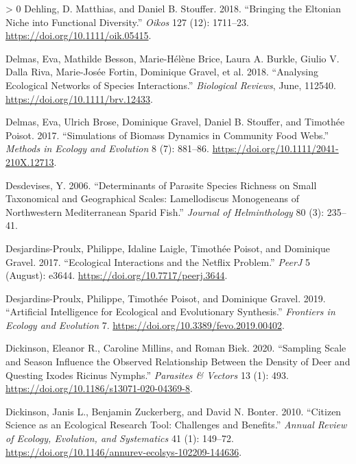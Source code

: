 \documentclass[11pt]{article}
\newlength{\cslhangindent}
\newenvironment{CSLReferences}[3] %
 {%
  \setlength{\parindent}{0pt}
  \ifodd #1 \everypar{\setlength{\hangindent}{\cslhangindent}}\ignorespaces\fi
  \ifnum #2 > 0
  \setlength{\parskip}{#2\baselineskip}
  \fi
 }%
 {}
\begin{document}
\begin{CSLReferences}{1}{0}
\leavevmode\hypertarget{ref-Dehling2018BriElt}{}%
Dehling, D. Matthias, and Daniel B. Stouffer. 2018. {``Bringing the
Eltonian Niche into Functional Diversity.''} \emph{Oikos} 127 (12):
1711--23. \url{https://doi.org/10.1111/oik.05415}.

\leavevmode\hypertarget{ref-Delmas2018AnaEco}{}%
Delmas, Eva, Mathilde Besson, Marie-Hélène Brice, Laura A. Burkle,
Giulio V. Dalla Riva, Marie-Josée Fortin, Dominique Gravel, et al. 2018.
{``Analysing Ecological Networks of Species Interactions.''}
\emph{Biological Reviews}, June, 112540.
\url{https://doi.org/10.1111/brv.12433}.

\leavevmode\hypertarget{ref-Delmas2017SimBio}{}%
Delmas, Eva, Ulrich Brose, Dominique Gravel, Daniel B. Stouffer, and
Timothée Poisot. 2017. {``Simulations of Biomass Dynamics in Community
Food Webs.''} \emph{Methods in Ecology and Evolution} 8 (7): 881--86.
\url{https://doi.org/10.1111/2041-210X.12713}.

\leavevmode\hypertarget{ref-Desdevises2006DetPar}{}%
Desdevises, Y. 2006. {``Determinants of Parasite Species Richness on
Small Taxonomical and Geographical Scales: Lamellodiscus Monogeneans of
Northwestern Mediterranean Sparid Fish.''} \emph{Journal of
Helminthology} 80 (3): 235--41.

\leavevmode\hypertarget{ref-Desjardins-Proulx2017EcoInt}{}%
Desjardins-Proulx, Philippe, Idaline Laigle, Timothée Poisot, and
Dominique Gravel. 2017. {``Ecological Interactions and the Netflix
Problem.''} \emph{PeerJ} 5 (August): e3644.
\url{https://doi.org/10.7717/peerj.3644}.

\leavevmode\hypertarget{ref-Desjardins-Proulx2019ArtInt}{}%
Desjardins-Proulx, Philippe, Timothée Poisot, and Dominique Gravel.
2019. {``Artificial Intelligence for Ecological and Evolutionary
Synthesis.''} \emph{Frontiers in Ecology and Evolution} 7.
\url{https://doi.org/10.3389/fevo.2019.00402}.

\leavevmode\hypertarget{ref-Dickinson2020SamSca}{}%
Dickinson, Eleanor R., Caroline Millins, and Roman Biek. 2020.
{``Sampling Scale and Season Influence the Observed Relationship Between
the Density of Deer and Questing Ixodes Ricinus Nymphs.''}
\emph{Parasites \& Vectors} 13 (1): 493.
\url{https://doi.org/10.1186/s13071-020-04369-8}.

\leavevmode\hypertarget{ref-Dickinson2010CitSci}{}%
Dickinson, Janis L., Benjamin Zuckerberg, and David N. Bonter. 2010.
{``Citizen Science as an Ecological Research Tool: Challenges and
Benefits.''} \emph{Annual Review of Ecology, Evolution, and Systematics}
41 (1): 149--72.
\url{https://doi.org/10.1146/annurev-ecolsys-102209-144636}.


\end{CSLReferences}
\end{document}
